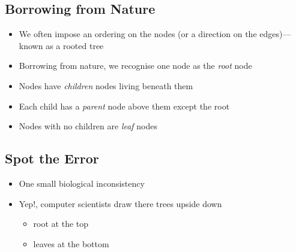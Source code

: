 
\begin{slide}
\section[-2]{Borrowing from Nature}

\begin{PauseHighLight}
  \begin{itemize}\squeeze
  \item We often impose an ordering on the nodes (or a direction on the
    edges)\pause---known as a rooted tree\pause
  \item Borrowing from nature, we recognise one node as the
    \emph{root} node\pause
  \item Nodes have \emph{children} nodes living beneath them
  \item Each child has a \emph{parent} node above them except the
    root\pause
  \item Nodes with no children are \emph{leaf} nodes\pause
  \end{itemize}
  \begin{center}
    \pause
  \end{center}\vspace{-2cm}
\end{PauseHighLight}
\end{slide}


\begin{slide}
\section[-1]{Spot the Error}
\pausebuild
\begin{itemize}
\item One small biological inconsistency\pause
\item Yep!, computer scientists draw there trees upside down\pause
  \begin{itemize}
  \item root at the top
  \item leaves at the bottom\pause
  \end{itemize}
  \begin{center}
    \pause
  \end{center}
\end{itemize}
\end{slide}


